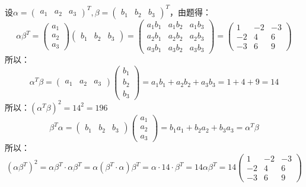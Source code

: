 \documentclass[a4paper]{report}
\begin{document}
\begin{jie}
设$\alpha=
\begin{pmatrix}
a_1&a_2&a_3
\end{pmatrix}^T
,\beta=
\begin{pmatrix}
b_1&b_2&b_3
\end{pmatrix}^T$，由题得：
\begin{equation*}
\alpha\beta^T=\begin{pmatrix}
a_1\\ a_2\\ a_3
\end{pmatrix}\begin{pmatrix}
b_1&b_2&b_3
\end{pmatrix}=
\begin{pmatrix}
a_1b_1 & a_1b_2 & a_1b_3\\
a_2b_1 & a_2b_2 & a_2b_3\\
a_3b_1 & a_3b_2 & a_3b_3
\end{pmatrix}=\begin{pmatrix}
1&-2&-3\\
-2&4&6\\
-3&6&9
\end{pmatrix}
\end{equation*}
所以：
\begin{equation*}
\alpha^T\beta=\begin{pmatrix}
a_1&a_2&a_3
\end{pmatrix}\begin{pmatrix}
b_1\\ b_2\\ b_3
\end{pmatrix}=a_1b_1+a_2b_2+a_3b_3=1+4+9=14
\end{equation*}
所以：$(\alpha^T\beta)^2=14^2=196$
\begin{equation*}
\beta^T\alpha=\begin{pmatrix}
b_1&b_2&b_3
\end{pmatrix}\begin{pmatrix}
a_1\\ a_2\\ a_3
\end{pmatrix}=b_1a_1+b_2a_2+b_3a_3=\alpha^T\beta
\end{equation*}
所以：
\begin{equation*}
  (\alpha\beta^T)^2=\alpha\beta^T\cdot\alpha\beta^T=\alpha(\beta^T\cdot\alpha)\beta^T=\alpha\cdot14\cdot\beta^T=14\alpha\beta^T=14\begin{pmatrix}
1&-2&-3\\
-2&4&6\\
-3&6&9
\end{pmatrix}
\end{equation*}
\end{jie}
\end{document}
